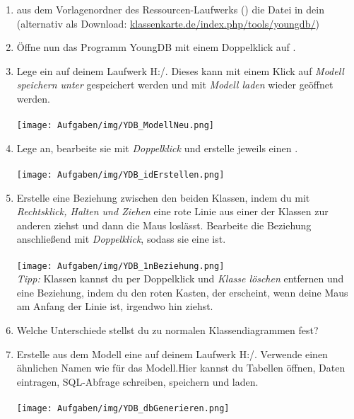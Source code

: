 
\begin{enumerate}
    \item {} aus dem Vorlagenordner des Ressourcen-Laufwerks () die Datei  in dein   (alternativ als Download: \url{klassenkarte.de/index.php/tools/youngdb/})
    \item Öffne nun das Programm YoungDB mit einem Doppelklick auf .
    \item Lege ein  auf deinem Laufwerk H:/. Dieses kann mit einem Klick auf \emph{Modell speichern unter} gespeichert werden und mit \emph{Modell laden} wieder geöffnet werden.\\\\
    \texttt{[image: Aufgaben/img/YDB\_ModellNeu.png]}
    \item Lege  an, bearbeite sie mit \emph{Doppelklick} und erstelle jeweils einen .\\\\
    \texttt{[image: Aufgaben/img/YDB\_idErstellen.png]}
    \item Erstelle eine Beziehung zwischen den beiden Klassen, indem du mit \emph{Rechtsklick, Halten und Ziehen} eine rote Linie aus einer der Klassen zur anderen ziehst und dann die Maus loslässt. Bearbeite die Beziehung anschließend mit \emph{Doppelklick}, sodass sie eine  ist.\\\\
    \texttt{[image: Aufgaben/img/YDB\_1nBeziehung.png]}\\
    \emph{Tipp:} Klassen kannst du per Doppelklick und \emph{Klasse löschen} entfernen und eine Beziehung, indem du den roten Kasten, der erscheint, wenn deine Maus am Anfang der Linie ist, irgendwo hin ziehst.
    \item {} Welche Unterschiede stellst du zu normalen Klassendiagrammen fest?\\
    \item Erstelle aus dem Modell eine  auf deinem Laufwerk H:/. Verwende einen ähnlichen Namen wie für das Modell.Hier kannst du Tabellen öffnen, Daten eintragen, SQL-Abfrage schreiben, speichern und laden.\\\\
    \texttt{[image: Aufgaben/img/YDB\_dbGenerieren.png]}
\end{enumerate}



